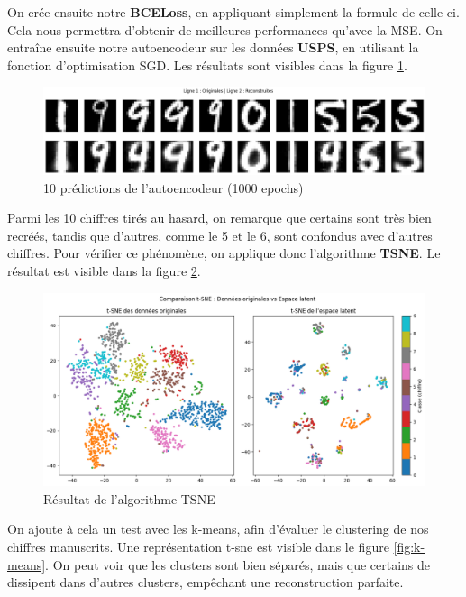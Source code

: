 \documentclass{article}
\begin{document}
On crée ensuite notre \textbf{BCELoss}, en appliquant simplement la formule de celle-ci. Cela nous permettra d'obtenir de meilleures performances qu'avec la MSE.
On entraîne ensuite notre autoencodeur sur les données \textbf{USPS}, en utilisant la fonction d'optimisation SGD.
Les résultats sont visibles dans la figure \ref{fig:autoecodeur}.
\begin{figure}[H]
    \centering
    \includegraphics[width=1\linewidth]{Images/autoecodeur.png}
    \caption{10 prédictions de l'autoencodeur (1000 epochs)}
    \label{fig:autoecodeur}
\end{figure}
Parmi les 10 chiffres tirés au hasard, on remarque que certains sont très bien recréés, tandis que d'autres, comme le 5 et le 6, sont confondus avec d'autres chiffres.  Pour vérifier ce phénomène, on applique donc l'algorithme \textbf{TSNE}. Le résultat est visible dans la figure \ref{fig:tsne}.
\begin{figure}[H]
    \centering
    \includegraphics[width=0.8\linewidth]{Images/t-sne.png}
    \caption{Résultat de l'algorithme TSNE}
    \label{fig:tsne}
\end{figure}
On ajoute à cela un test avec les k-means, afin d'évaluer le clustering de nos chiffres manuscrits. Une représentation t-sne est visible dans le figure \ref{fig:k-means}. On peut voir que les clusters sont bien séparés, mais que certains de dissipent dans d'autres clusters, empêchant une reconstruction parfaite.
\end{document}
